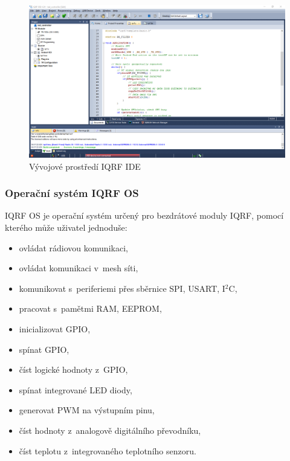 \documentclass[12pt,a4paper]{article}
\begin{document}
\begin{figure}[H]
\centering
\label{fig:iqrf/ide}
\includegraphics[width = 150mm]{img/iqrf/ide.png}
\caption{Vývojové prostředí IQRF IDE}
\end{figure}

\newpage

\subsubsection{Operační systém IQRF OS}

IQRF OS\cite{iqrf/os} je operační systém určený pro bezdrátové moduly IQRF, pomocí kterého může uživatel jednoduše:

\begin{itemize}
  \item ovládat rádiovou komunikaci,
  \item ovládat komunikaci v~mesh síti,
  \item komunikovat s~periferiemi přes sběrnice SPI, USART, I$^{2}$C,
  \item pracovat s~pamětmi RAM, EEPROM,
  \item inicializovat GPIO,
  \item spínat GPIO,
  \item číst logické hodnoty z~GPIO,
  \item spínat integrované LED diody,
  \item generovat PWM na výstupním pinu,
  \item číst hodnoty z~analogově digitálního převodníku,
  \item číst teplotu z~integrovaného teplotního senzoru.
\end{itemize}
\end{document}
